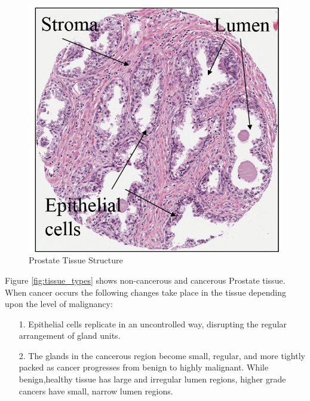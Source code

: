 \begin{figure}[!htb]
\centering
\includegraphics[scale=0.3]{figs/tissue_structure1.png}
\caption{Prostate Tissue Structure}\label{fig:tissue_structure1}
\centering
\end{figure}


Figure \ref{fig:tissue_types} shows non-cancerous and cancerous Prostate tissue. When cancer occurs the following changes take place in the tissue depending upon the level of malignancy:
\begin{enumerate}
\item[1.] Epithelial cells replicate in an uncontrolled way, disrupting the regular arrangement of gland units.
\item[2.] The glands in the cancerous region become small, regular, and more tightly packed as
cancer progresses from benign to highly malignant. While benign,healthy tissue has large and irregular lumen regions, higher grade cancers have small, narrow lumen regions.
\end{enumerate}




